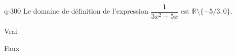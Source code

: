 \begin{truefalse}{q-300}
Le domaine de définition de l'expression $\dfrac{1}{3x^2+5x}$ est $\mathbb R \setminus \{-5/3,0\}$.
\item* Vrai
\item Faux
\end{truefalse}

